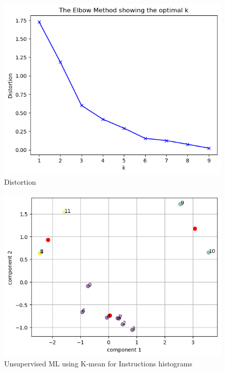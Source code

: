 \documentclass[]{PhDEngScITESO-R}
\begin{document}
\begin{figure}[h]
    \centering
    \includegraphics[width=\textwidth] {Reporte IDI-2 ITESO/img/distortion_spec.png}
    \caption{Distortion}
    \label{fig:distortion}
\end{figure}


\begin{figure}[h]
    \centering
    \includegraphics[width=\textwidth]{Reporte IDI-2 ITESO/img/kmean_spec.png}
    \caption{Unsupervised ML using K-mean for Instructions histograms}
    \label{fig:kmeans}
\end{figure}
\end{document}
